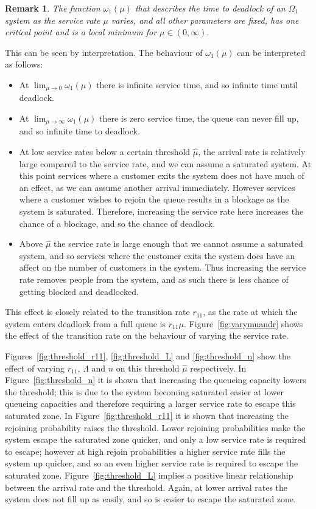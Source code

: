 \documentclass{article}
\newtheorem{remark}{Remark}
\begin{document}
\begin{remark}\label{rem:oneminima}
The function $\omega_1(\mu)$ that describes the time to deadlock of an $\Omega_1$ system as the service rate $\mu$ varies, and all other parameters are fixed, has one critical point and is a local minimum for $\mu \in (0, \infty)$.
\end{remark}

This can be seen by interpretation.
The behaviour of $\omega_1(\mu)$ can be interpreted as follows:
\begin{itemize}
\item At $\lim_{\mu \to 0} \omega_1 (\mu)$ there is infinite service time, and so infinite time until deadlock.
\item At $\lim_{\mu \to \infty} \omega_1 (\mu)$ there is zero service time, the queue can never fill up, and so infinite time to deadlock.
\item At low service rates below a certain threshold $\hat{\mu}$, the arrival rate is relatively large compared to the service rate, and we can assume a saturated system.
At this point services where a customer exits the system does not have much of an effect, as we can assume another arrival immediately.
However services where a customer wishes to rejoin the queue results in a blockage as the system is saturated.
Therefore, increasing the service rate here increases the chance of a blockage, and so the chance of deadlock.
\item Above $\hat{\mu}$ the service rate is large enough that we cannot assume a saturated system, and so services where the customer exits the system does have an affect on the number of customers in the system.
Thus increasing the service rate removes people from the system, and as such there is less chance of getting blocked and deadlocked.
\end{itemize}

This effect is closely related to the transition rate $r_{11}$, as the rate at which the system enters deadlock from a full queue is $r_{11}\mu$.
Figure~\ref{fig:varymuandr} shows the effect of the transition rate on the behaviour of varying the service rate.

Figures~\ref{fig:threshold_r11}, \ref{fig:threshold_L} and \ref{fig:threshold_n} show the effect of varying $r_{11}$, $\Lambda$ and $n$ on this threshold $\hat{\mu}$ respectively.
In Figure~\ref{fig:threshold_n} it is shown that increasing the queueing capacity lowers the threshold; this is due to the system becoming saturated easier at lower queueing capacities and therefore requiring a larger service rate to escape this saturated zone.
In Figure~\ref{fig:threshold_r11} it is shown that increasing the rejoining probability raises the threshold.
Lower rejoining probabilities make the system escape the saturated zone quicker, and only a low service rate is required to escape; however at high rejoin probabilities a higher service rate fills the system up quicker, and so an even higher service rate is required to escape the saturated zone.
Figure~\ref{fig:threshold_L} implies a positive linear relationship between the arrival rate and the threshold.
Again, at lower arrival rates the system does not fill up as easily, and so is easier to escape the saturated zone.\\
\end{document}
